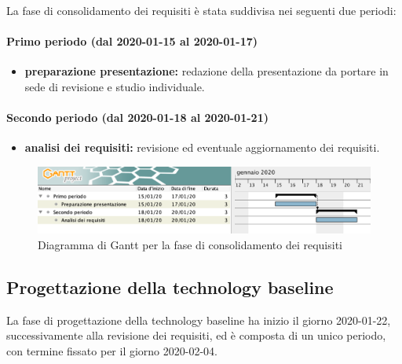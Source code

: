 				La fase di consolidamento dei requisiti è stata suddivisa nei seguenti due periodi:
				
				\paragraph{Primo periodo (dal 2020-01-15 al 2020-01-17)}
				
					\begin{itemize}
						\item \textbf{preparazione presentazione:} redazione della presentazione da portare in sede di revisione e studio individuale.
					\end{itemize}
				
				\paragraph{Secondo periodo (dal 2020-01-18 al 2020-01-21)}
				
					\begin{itemize}
						\item \textbf{analisi dei requisiti:} revisione ed eventuale aggiornamento dei requisiti.
					\end{itemize}

		\begin{landscape}

          \begin{figure}[H]
            \centering
            \includegraphics[width=\linewidth]{images/gantt/consolidamentoDeiRequisiti}
            \caption{Diagramma di Gantt per la fase di consolidamento dei requisiti}
          \end{figure}		

		\end{landscape}

		\subsection{Progettazione della technology baseline}
	
			La fase di progettazione della technology baseline ha inizio il giorno 2020-01-22, successivamente alla revisione dei requisiti, ed è composta di un unico periodo, con termine fissato per il giorno 2020-02-04.
			
